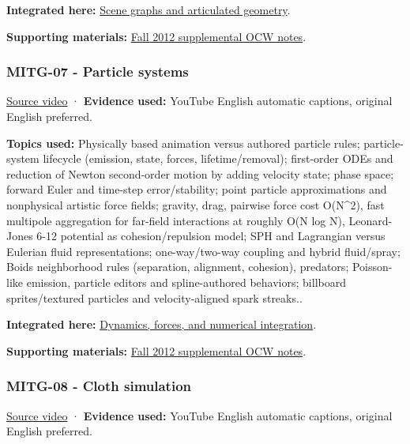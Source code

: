 \textbf{Integrated here:} \hyperref[04-visual-computing-ii-ch029-scene-graphs-and-articulated-geometry]{Scene graphs and articulated geometry}.

\textbf{Supporting materials:} \href{https://ocw.mit.edu/courses/6-837-computer-graphics-fall-2012/pages/lecture-notes/}{Fall 2012 supplemental OCW notes}.

\subsubsection{MITG-07 - Particle systems}\label{04-visual-computing-ii-ch036-mitg-07---particle-systems}

\href{https://www.youtube.com/watch?v=-PGuhbZ2khE}{Source video} · \textbf{Evidence used:} YouTube English automatic captions, original English preferred.

\textbf{Topics used:} Physically based animation versus authored particle rules; particle-system lifecycle (emission, state, forces, lifetime/removal); first-order ODEs and reduction of Newton second-order motion by adding velocity state; phase space; forward Euler and time-step error/stability; point particle approximations and nonphysical artistic force fields; gravity, drag, pairwise force cost O(N\^{}2), fast multipole aggregation for far-field interactions at roughly O(N log N), Leonard-Jones 6-12 potential as cohesion/repulsion model; SPH and Lagrangian versus Eulerian fluid representations; one-way/two-way coupling and hybrid fluid/spray; Boids neighborhood rules (separation, alignment, cohesion), predators; Poisson-like emission, particle editors and spline-authored behaviors; billboard sprites/textured particles and velocity-aligned spark streaks..

\textbf{Integrated here:} \hyperref[04-visual-computing-ii-ch029-dynamics-forces-and-numerical-integration]{Dynamics, forces, and numerical integration}.

\textbf{Supporting materials:} \href{https://ocw.mit.edu/courses/6-837-computer-graphics-fall-2012/pages/lecture-notes/}{Fall 2012 supplemental OCW notes}.

\subsubsection{MITG-08 - Cloth simulation}\label{04-visual-computing-ii-ch036-mitg-08---cloth-simulation}

\href{https://www.youtube.com/watch?v=PJ8VzufNZ8o}{Source video} · \textbf{Evidence used:} YouTube English automatic captions, original English preferred.

